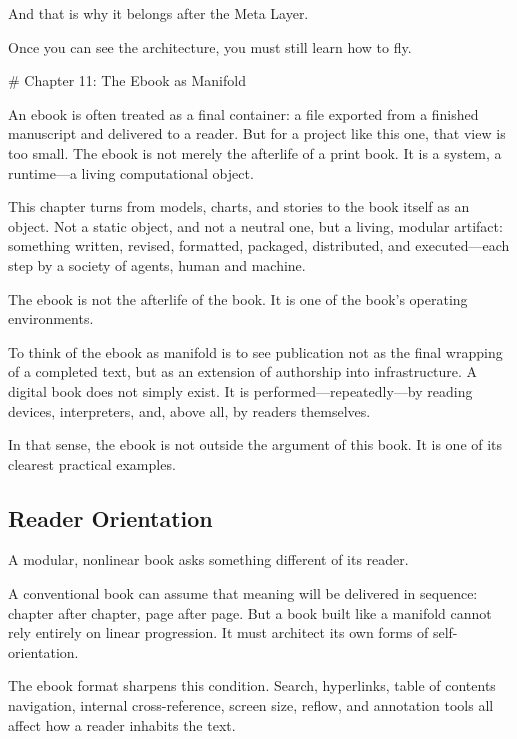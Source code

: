 \documentclass[
]{article}
\begin{document}
And that is why it belongs after the Meta Layer.

Once you can see the architecture, you must still learn how to fly.

\newpage
\vspace*{3cm}
\begin{center}
# Chapter 11: The Ebook as Manifold
\end{center}

An ebook is often treated as a final container: a file exported from a
finished manuscript and delivered to a reader. But for a project like
this one, that view is too small. The ebook is not merely the afterlife
of a print book. It is a system, a runtime---a living computational
object.

This chapter turns from models, charts, and stories to the book itself
as an object. Not a static object, and not a neutral one, but a living,
modular artifact: something written, revised, formatted, packaged,
distributed, and executed---each step by a society of agents, human and
machine.

The ebook is not the afterlife of the book. It is one of the book's
operating environments.

To think of the ebook as manifold is to see publication not as the final
wrapping of a completed text, but as an extension of authorship into
infrastructure. A digital book does not simply exist. It is
performed---repeatedly---by reading devices, interpreters, and, above
all, by readers themselves.

In that sense, the ebook is not outside the argument of this book. It is
one of its clearest practical examples.

\hypertarget{reader-orientation}{%
\subsection{Reader Orientation}\label{reader-orientation}}

A modular, nonlinear book asks something different of its reader.

A conventional book can assume that meaning will be delivered in
sequence: chapter after chapter, page after page. But a book built like
a manifold cannot rely entirely on linear progression. It must architect
its own forms of self-orientation.

The ebook format sharpens this condition. Search, hyperlinks, table of
contents navigation, internal cross-reference, screen size, reflow, and
annotation tools all affect how a reader inhabits the text.
\end{document}
